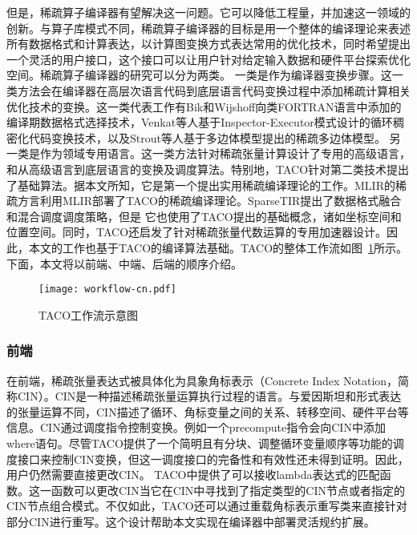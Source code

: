 但是，稀疏算子编译器有望解决这一问题。它可以降低工程量，并加速这一领域的创新。与算子库模式不同，稀疏算子编译器的目标是用一个整体的编译理论来表述所有数据格式和计算表达，以计算图变换方式表达常用的优化技术，同时希望提出一个灵活的用户接口，这个接口可以让用户针对给定输入数据和硬件平台探索优化空间。稀疏算子编译器的研究可以分为两类。
一类是作为编译器变换步骤。这一类方法会在编译器在高层次语言代码到底层语言代码变换过程中添加稀疏计算相关优化技术的变换。这一类代表工作有Bik和Wijshoff向类FORTRAN语言中添加的编译期数据格式选择技术\cite{bik1993compilation}，Venkat等人基于Inspector-Executor模式设计的循环稠密化代码变换技术，以及Strout等人基于多边体模型\cite{polyhedral}提出的稀疏多边体模型\cite{strout2018sparse}。
另一类是作为领域专用语言。这一类方法针对稀疏张量计算设计了专用的高级语言，和从高级语言到底层语言的变换及调度算法\cite{SparseTIR,kjolstad:2020:phd-thesis,bik2022compiler}。特别地，TACO\cite{kjolstad:2017:taco,kjolstad:2019:workspaces,kjolstad:2020:phd-thesis,senanayake:2020:scheduling}针对第二类技术提出了基础算法。据本文所知，它是第一个提出实用稀疏编译理论的工作。MLIR的稀疏方言\cite{bik2022compiler}利用MLIR部署了TACO的稀疏编译理论。SparseTIR\cite{SparseTIR}提出了数据格式融合和混合调度调度策略，但是
它也使用了TACO提出的基础概念，诸如坐标空间和位置空间。同时，TACO还启发了针对稀疏张量代数运算的专用加速器设计\cite{qin2022HardTACO}。因此，本文的工作也基于TACO的编译算法基础。TACO的整体工作流如图~\ref{fig:tacoworkflow}所示。下面，本文将以前端、中端、后端的顺序介绍。
\begin{figure}[h]%
  \centering
  \texttt{[image: workflow-cn.pdf]}
  \caption{TACO工作流示意图}\label{fig:tacoworkflow}
\end{figure}
\subsubsection{前端}
在前端，稀疏张量表达式被具体化为具象角标表示（Concrete Index Notation，简称CIN）\cite{kjolstad:2019:workspaces}。CIN是一种描述稀疏张量运算执行过程的语言。与爱因斯坦和形式表达的张量运算不同，CIN描述了循环、角标变量之间的关系、转移空间、硬件平台等信息。CIN通过调度指令控制变换。例如一个precompute指令会向CIN中添加where语句。尽管TACO提供了一个简明且有分块、调整循环变量顺序等功能的调度接口来控制CIN变换，但这一调度接口的完备性和有效性还未得到证明\cite{ahrens:2022:autoscheduling}。因此，用户仍然需要直接更改CIN。
TACO中提供了可以接收lambda表达式的匹配函数。这一函数可以更改CIN当它在CIN中寻找到了指定类型的CIN节点或者指定的CIN节点组合模式。不仅如此，TACO还可以通过重载角标表示重写类来直接针对部分CIN进行重写。这个设计帮助本文实现在编译器中部署灵活规约扩展。
